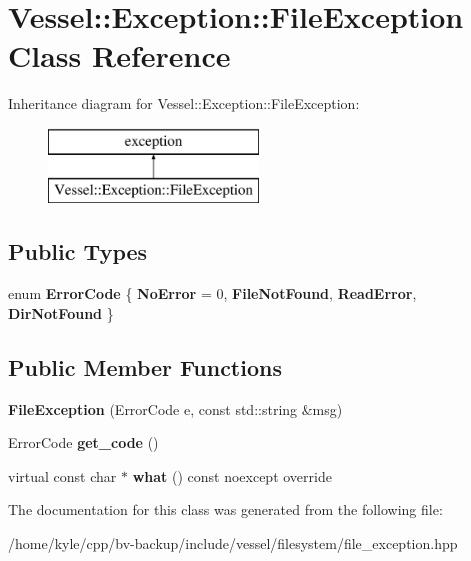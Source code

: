 \hypertarget{class_vessel_1_1_exception_1_1_file_exception}{}\section{Vessel\+:\+:Exception\+:\+:File\+Exception Class Reference}
\label{class_vessel_1_1_exception_1_1_file_exception}
Inheritance diagram for Vessel\+:\+:Exception\+:\+:File\+Exception\+:\begin{figure}[H]
\begin{center}
\leavevmode
\includegraphics[height=2.000000cm]{class_vessel_1_1_exception_1_1_file_exception}
\end{center}
\end{figure}
\subsection*{Public Types}
\begin{DoxyCompactItemize}
\item 
\mbox{\label{class_vessel_1_1_exception_1_1_file_exception_acfaea4e62709b3af50193eda37ef4b80}} 
enum {\bfseries Error\+Code} \{ {\bfseries No\+Error} = 0, 
{\bfseries File\+Not\+Found}, 
{\bfseries Read\+Error}, 
{\bfseries Dir\+Not\+Found}
 \}
\end{DoxyCompactItemize}
\subsection*{Public Member Functions}
\begin{DoxyCompactItemize}
\item 
\mbox{\label{class_vessel_1_1_exception_1_1_file_exception_a32d77bd0b49d0601a701e223025f9d51}} 
{\bfseries File\+Exception} (Error\+Code e, const std\+::string \&msg)
\item 
\mbox{\label{class_vessel_1_1_exception_1_1_file_exception_af1de58f302b25400e03dea37111a9296}} 
Error\+Code {\bfseries get\+\_\+code} ()
\item 
\mbox{\label{class_vessel_1_1_exception_1_1_file_exception_adc6d029a67b9c5c5ab89697f51894650}} 
virtual const char $\ast$ {\bfseries what} () const noexcept override
\end{DoxyCompactItemize}


The documentation for this class was generated from the following file\+:\begin{DoxyCompactItemize}
\item 
/home/kyle/cpp/bv-\/backup/include/vessel/filesystem/file\+\_\+exception.\+hpp\end{DoxyCompactItemize}
